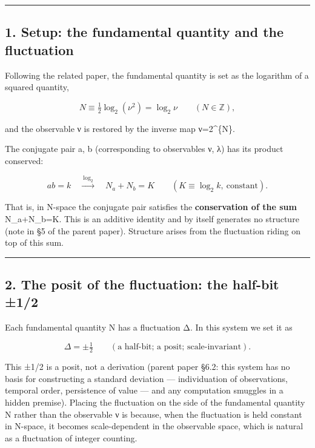 \documentclass[11pt]{ltjsarticle}
\begin{document}
\begin{center}\rule{0.5\linewidth}{0.5pt}\end{center}

\subsection{1. Setup: the fundamental quantity and the
fluctuation}\label{setup-the-fundamental-quantity-and-the-fluctuation}

Following the related paper, the fundamental quantity is set as the
logarithm of a squared quantity,

\[N \equiv \tfrac{1}{2}\log_2(\nu^2) = \log_2\nu \qquad (N\in\mathbb{Z}),\]

and the observable ν is restored by the inverse map ν=2\^{}\{N\}.

The conjugate pair a, b (corresponding to observables ν, λ) has its
product conserved:

\[ab = k \quad\xrightarrow{\ \log_2\ }\quad N_a + N_b = K \qquad (K\equiv\log_2 k,\ \text{constant}).\]

That is, in N-space the conjugate pair satisfies the
\textbf{conservation of the sum} N\_a+N\_b=K. This is an additive
identity and by itself generates no structure (note in §5 of the parent
paper). Structure arises from the fluctuation riding on top of this sum.

\begin{center}\rule{0.5\linewidth}{0.5pt}\end{center}

\subsection{2. The posit of the fluctuation: the half-bit
±1/2}\label{the-posit-of-the-fluctuation-the-half-bit-12}

Each fundamental quantity N has a fluctuation Δ. In this system we set
it as

\[\Delta = \pm\tfrac{1}{2} \qquad (\text{a half-bit; a posit; scale-invariant}).\]

This ±1/2 is a posit, not a derivation (parent paper §6.2: this system
has no basis for constructing a standard deviation --- individuation of
observations, temporal order, persistence of value --- and any
computation smuggles in a hidden premise). Placing the fluctuation on
the side of the fundamental quantity N rather than the observable ν is
because, when the fluctuation is held constant in N-space, it becomes
scale-dependent in the observable space, which is natural as a
fluctuation of integer counting.
\end{document}
